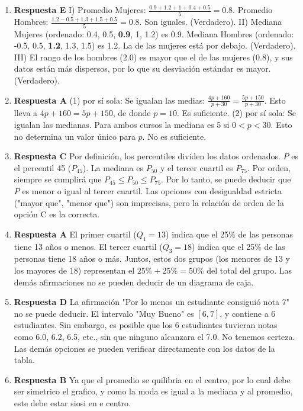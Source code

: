\documentclass[11pt]{article}
\begin{document}
\begin{enumerate}
    \item \textbf{Respuesta E} I) Promedio Mujeres: $\frac{0.9+1.2+1+0.4+0.5}{5}=0.8$. Promedio Hombres: $\frac{1.2-0.5+1.3+1.5+0.5}{5}=0.8$. Son iguales. (Verdadero). II) Mediana Mujeres (ordenado: 0.4, 0.5, \textbf{0.9}, 1, 1.2) es 0.9. Mediana Hombres (ordenado: -0.5, 0.5, \textbf{1.2}, 1.3, 1.5) es 1.2. La de las mujeres está por debajo. (Verdadero). III) El rango de los hombres ($2.0$) es mayor que el de las mujeres ($0.8$), y sus datos están más dispersos, por lo que su desviación estándar es mayor. (Verdadero). %
    
    \item \textbf{Respuesta A} (1) por sí sola: Se igualan las medias: $\frac{4p+160}{p+30} = \frac{5p+150}{p+30}$. Esto lleva a $4p+160=5p+150$, de donde $p=10$. Es suficiente. (2) por sí sola: Se igualan las medianas. Para ambos cursos la mediana es 5 si $0 < p < 30$. Esto no determina un valor único para $p$. No es suficiente. %
    
    \item \textbf{Respuesta C} Por definición, los percentiles dividen los datos ordenados. $P$ es el percentil 45 ($P_{45}$). La mediana es $P_{50}$ y el tercer cuartil es $P_{75}$. Por orden, siempre se cumplirá que $P_{45} \leq P_{50} \leq P_{75}$. Por lo tanto, se puede deducir que $P$ es menor o igual al tercer cuartil. Las opciones con desigualdad estricta ("mayor que", "menor que") son imprecisas, pero la relación de orden de la opción C es la correcta. %
    
    \item \textbf{Respuesta A} El primer cuartil ($Q_1=13$) indica que el 25\% de las personas tiene 13 años o menos. El tercer cuartil ($Q_3=18$) indica que el 25\% de las personas tiene 18 años o más. Juntos, estos dos grupos (los menores de 13 y los mayores de 18) representan el $25\% + 25\% = 50\%$ del total del grupo. Las demás afirmaciones no se pueden deducir de un diagrama de caja. %
    
    \item \textbf{Respuesta D} La afirmación "Por lo menos un estudiante consiguió nota 7" no se puede deducir. El intervalo "Muy Bueno" es $[6, 7]$, y contiene a 6 estudiantes. Sin embargo, es posible que los 6 estudiantes tuvieran notas como 6.0, 6.2, 6.5, etc., sin que ninguno alcanzara el 7.0. No tenemos certeza. Las demás opciones se pueden verificar directamente con los datos de la tabla. %
    

    \item \textbf{Respuesta B} Ya que el promedio se quilibria en el centro, por lo cual debe ser simetrico el grafico, y como la moda es igual a la mediana y al promedio, este debe estar siosi en e centro.


\end{enumerate}
\end{document}
